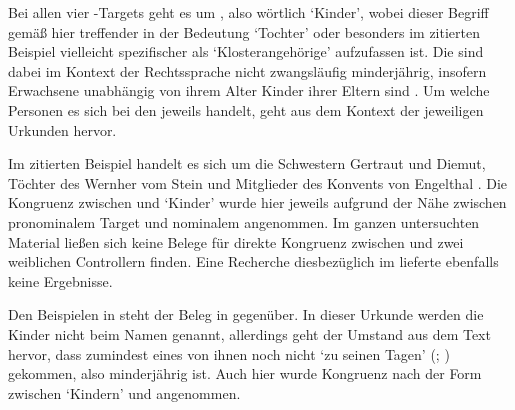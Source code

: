Bei allen vier -Targets geht es um , also wörtlich
`Kinder', wobei dieser Begriff gemäß \citet[s.\,v.~]{lexer:mhdhwb}
hier treffender in der Bedeutung `Tochter' %
oder besonders im zitierten Beispiel vielleicht spezifischer als
`Klosterangehörige'
aufzufassen ist. Die  sind dabei im Kontext der Rechtssprache nicht
zwangsläufig minderjährig, insofern Erwachsene unabhängig von ihrem Alter
Kinder ihrer Eltern sind \autocites[vgl.][1736]{schwab2012}[siehe
auch][258--259]{birkenesfleischer2022}. Um welche Personen es sich bei den
 jeweils handelt, geht aus dem Kontext der jeweiligen
Urkunden hervor.

Im zitierten Beispiel handelt es sich um
die Schwestern Gertraut und Diemut, Töchter des Wernher vom Stein und
Mitglieder des Konvents von Engelthal \autocite[Kr.~Nürnberger Land;
vgl.][619]{caor}. Die Kongruenz zwischen  und  `Kinder'
wurde hier jeweils aufgrund der Nähe zwischen pronominalem Target und nominalem
 angenommen. Im ganzen unter\-suchten Material ließen sich
keine Belege für direkte Kongruenz zwischen  und zwei weiblichen
Controllern finden. Eine Recherche diesbezüglich im \REM{} lieferte ebenfalls
keine Ergeb\-nisse.

Den Beispielen in  steht der Beleg in
 gegenüber. In dieser Urkunde werden die Kinder
nicht beim Namen genannt, allerdings geht der Umstand aus dem Text hervor, dass
zumindest eines von ihnen noch nicht  `zu seinen Tagen'
(\cites(Nr.~214)[218,18--19]{cao1}; \cite[vgl.][26]{caor}) gekommen, also
minderjährig ist. Auch hier wurde Kongruenz nach der Form zwischen
 `Kindern' und  angenommen.

\begin{exe}
\end{exe}

